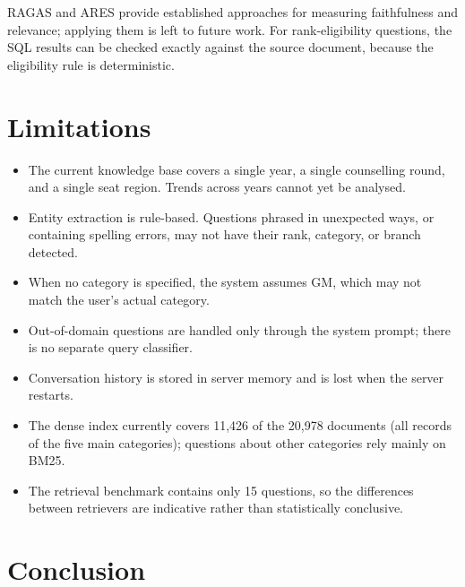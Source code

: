 \documentclass[conference]{IEEEtran}
\begin{document}
RAGAS \cite{RAGAS2023} and ARES \cite{ARES2024} provide
established approaches for measuring faithfulness and relevance;
applying them is left to future work. For rank-eligibility
questions, the SQL results can be checked exactly against the source
document, because the eligibility rule is deterministic.

\section{Limitations}

\begin{itemize}
    \item The current knowledge base covers a single year, a single
    counselling round, and a single seat region. Trends across years
    cannot yet be analysed.

    \item Entity extraction is rule-based. Questions phrased in
    unexpected ways, or containing spelling errors, may not have
    their rank, category, or branch detected.

    \item When no category is specified, the system assumes GM,
    which may not match the user's actual category.

    \item Out-of-domain questions are handled only through the
    system prompt; there is no separate query classifier.

    \item Conversation history is stored in server memory and is
    lost when the server restarts.

    \item The dense index currently covers 11,426 of the 20,978
    documents (all records of the five main categories); questions
    about other categories rely mainly on BM25.

    \item The retrieval benchmark contains only 15 questions, so the
    differences between retrievers are indicative rather than
    statistically conclusive.
\end{itemize}

\section{Conclusion}
\end{document}
